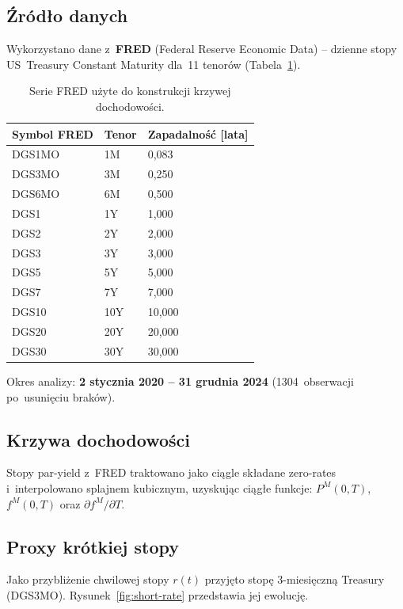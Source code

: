 \documentclass[12pt,a4paper]{article}
\begin{document}
\subsection{Źródło danych}

Wykorzystano dane z~\textbf{FRED} (Federal Reserve Economic Data) --
dzienne stopy US~Treasury Constant Maturity dla~11 tenorów
(Tabela~\ref{tab:series}).

\begin{table}[H]
  \centering
  \caption{Serie FRED użyte do konstrukcji krzywej dochodowości.}
  \label{tab:series}
  \begin{tabular}{@{}lll@{}}
    \toprule
    \textbf{Symbol FRED} & \textbf{Tenor} & \textbf{Zapadalność [lata]} \\
    \midrule
    DGS1MO  & 1M   & 0,083  \\
    DGS3MO  & 3M   & 0,250  \\
    DGS6MO  & 6M   & 0,500  \\
    DGS1    & 1Y   & 1,000  \\
    DGS2    & 2Y   & 2,000  \\
    DGS3    & 3Y   & 3,000  \\
    DGS5    & 5Y   & 5,000  \\
    DGS7    & 7Y   & 7,000  \\
    DGS10   & 10Y  & 10,000 \\
    DGS20   & 20Y  & 20,000 \\
    DGS30   & 30Y  & 30,000 \\
    \bottomrule
  \end{tabular}
\end{table}

Okres analizy: \textbf{2 stycznia 2020 -- 31 grudnia 2024}
(1304~obserwacji po~usunięciu braków).

\subsection{Krzywa dochodowości}

Stopy par-yield z~FRED traktowano jako ciągle składane zero-rates
i~interpolowano splajnem kubicznym, uzyskując ciągłe funkcje:
$P^M(0,T)$, $f^M(0,T)$ oraz $\partial f^M/\partial T$.

\subsection{Proxy krótkiej stopy}

Jako przybliżenie chwilowej stopy $r(t)$ przyjęto stopę 3-miesięczną
Treasury (DGS3MO). Rysunek~\ref{fig:short-rate} przedstawia jej ewolucję.
\end{document}

